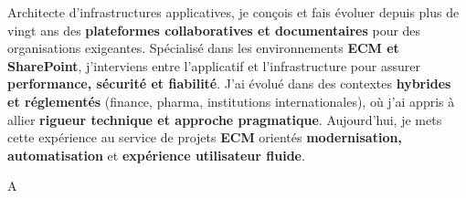 \par{
Architecte d’infrastructures applicatives, je conçois et fais évoluer depuis plus de vingt ans des \textbf{plateformes collaboratives et documentaires} pour des organisations exigeantes.
Spécialisé dans les environnements \textbf{ECM et SharePoint}, j’interviens entre l’applicatif et l’infrastructure pour assurer \textbf{performance, sécurité et fiabilité}.
J’ai évolué dans des contextes \textbf{hybrides et réglementés} (finance, pharma, institutions internationales), où j’ai appris à allier \textbf{rigueur technique et approche pragmatique}.
Aujourd’hui, je mets cette expérience au service de projets \textbf{ECM} orientés \textbf{modernisation, automatisation} et \textbf{expérience utilisateur fluide}.
}

A